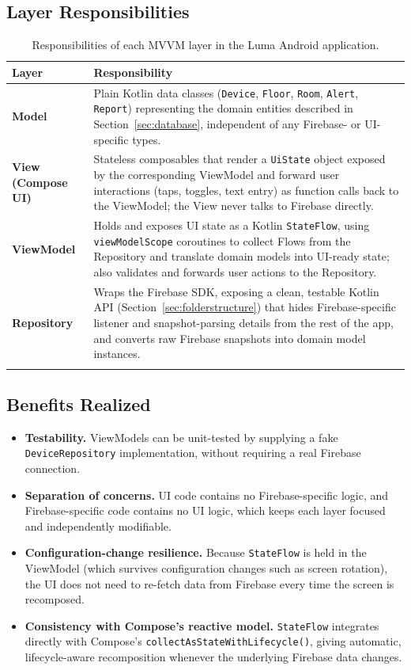 \documentclass[11pt,a4paper]{article}
\begin{document}
\subsection{Layer Responsibilities}
\begin{longtable}{@{}p{2.6cm}p{10.6cm}@{}}
\toprule
\textbf{Layer} & \textbf{Responsibility} \\
\midrule
\endhead
\textbf{Model} & Plain Kotlin data classes (\texttt{Device}, \texttt{Floor}, \texttt{Room}, \texttt{Alert}, \texttt{Report}) representing the domain entities described in Section~\ref{sec:database}, independent of any Firebase- or UI-specific types. \\
\textbf{View (Compose UI)} & Stateless composables that render a \texttt{UiState} object exposed by the corresponding ViewModel and forward user interactions (taps, toggles, text entry) as function calls back to the ViewModel; the View never talks to Firebase directly. \\
\textbf{ViewModel} & Holds and exposes UI state as a Kotlin \texttt{StateFlow}, using \texttt{viewModelScope} coroutines to collect Flows from the Repository and translate domain models into UI-ready state; also validates and forwards user actions to the Repository. \\
\textbf{Repository} & Wraps the Firebase SDK, exposing a clean, testable Kotlin API (Section~\ref{sec:folderstructure}) that hides Firebase-specific listener and snapshot-parsing details from the rest of the app, and converts raw Firebase snapshots into domain model instances. \\
\bottomrule
\caption{Responsibilities of each MVVM layer in the Luma Android application.}
\label{tab:mvvm-responsibilities}
\end{longtable}

\subsection{Benefits Realized}
\begin{itemize}
    \item \textbf{Testability.} ViewModels can be unit-tested by supplying a fake \texttt{DeviceRepository} implementation, without requiring a real Firebase connection.
    \item \textbf{Separation of concerns.} UI code contains no Firebase-specific logic, and Firebase-specific code contains no UI logic, which keeps each layer focused and independently modifiable.
    \item \textbf{Configuration-change resilience.} Because \texttt{StateFlow} is held in the ViewModel (which survives configuration changes such as screen rotation), the UI does not need to re-fetch data from Firebase every time the screen is recomposed.
    \item \textbf{Consistency with Compose's reactive model.} \texttt{StateFlow} integrates directly with Compose's \texttt{collectAsStateWithLifecycle()}, giving automatic, lifecycle-aware recomposition whenever the underlying Firebase data changes.
\end{itemize}
\end{document}
